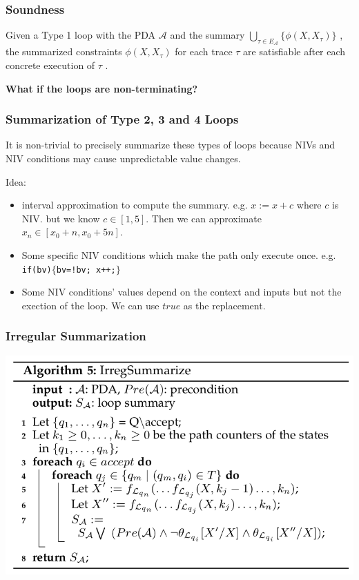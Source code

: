 \documentclass[11pt]{beamer}
\begin{document}
\begin{frame}\frametitle{Soundness}
\begin{theorem}
Given a Type 1 loop with the PDA
$\mathcal{A}$ and the summary $\bigcup_{\tau\in E_\mathcal{A}} \{\phi(X, X_\tau)\}$ , the summarized
constraints $\phi(X, X_\tau)$ for each trace $\tau$ are satisfiable after
each concrete execution of $\tau$ .
\end{theorem}

\textbf{What if the loops are non-terminating?}
\end{frame}

\begin{frame}\frametitle{Summarization of Type 2, 3 and 4 Loops}
It is non-trivial to precisely summarize these types of loops because NIVs and NIV conditions may cause unpredictable value changes.

Idea: 
\begin{itemize}
\item interval approximation to compute the summary.
e.g. $x := x + c$ where $c$ is NIV. but we know $c \in [1, 5]$. Then we can approximate $x_n \in [x_0  + n, x_0 + 5n]$.
\item Some specific NIV conditions which make the path only execute once. e.g. \texttt{if(bv)$\{$bv=!bv; x++;$\}$}

\item Some NIV conditions' values depend on the context and inputs but not the exection of the loop. We can use $true$ as the replacement.
\end{itemize} 
\end{frame}
\iffalse
\begin{frame}\frametitle{Irregular Summarization}
\begin{center}
\includegraphics[scale=0.35]{algo5.png}
\end{center}
\end{frame}
\end{document}
